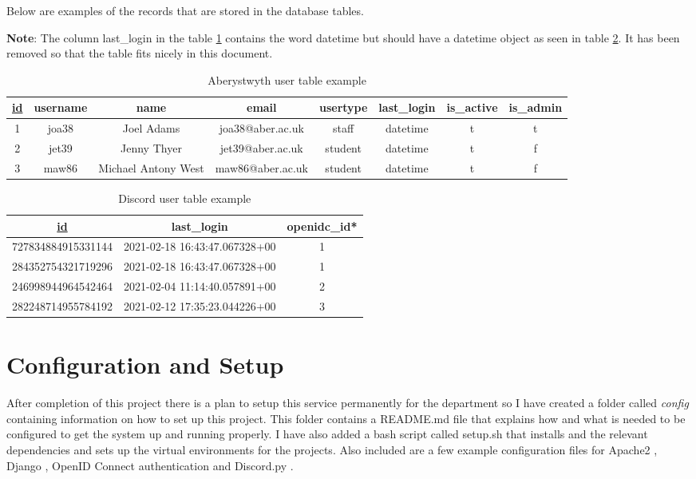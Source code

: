 Below are examples of the records that are stored in the database tables. 

\textbf{Note}: The column last\_login in the table \ref{tab:aber-table} contains the word datetime but should have a datetime object as seen in table \ref{tab:dis-table}. It has been removed so that the table fits nicely in this document.

\begin{table}[H]
	\centering
	\small
	\setlength\tabcolsep{2pt}
	\begin{tabular}{|c|c|c|c|c|c|c|c|}
		\hline
		\underline{id} & username & name & email & usertype & last\_login & is\_active & is\_admin \\
		\hline
		1 & joa38 & Joel Adams & joa38@aber.ac.uk & staff & datetime & t & t \\
		2 & jet39 & Jenny Thyer & jet39@aber.ac.uk & student & datetime & t & f \\
		3 & maw86 & Michael Antony West & maw86@aber.ac.uk & student & datetime & t & f \\
		\hline 
	\end{tabular}
	\caption{Aberystwyth user table example}
	\label{tab:aber-table}
\end{table}

\begin{table}[H]
	\centering
	\small
	\setlength\tabcolsep{2pt}
	\begin{tabular}{|c|c|c|}
		\hline
		\underline{id}                 & last\_login                   & openidc\_id* \\
		\hline
		727834884915331144 & 2021-02-18 16:43:47.067328+00 & 1           \\
		284352754321719296 & 2021-02-18 16:43:47.067328+00 & 1           \\
		246998944964542464 & 2021-02-04 11:14:40.057891+00 & 2           \\
		282248714955784192 & 2021-02-12 17:35:23.044226+00 & 3           \\
		\hline
	\end{tabular}
	\caption{Discord user table example}
	\label{tab:dis-table}
\end{table}

\section{Configuration and Setup}
After completion of this project there is a plan to setup this service permanently for the department so I have created a folder called \textit{config} containing information on how to set up this project. This folder contains a README.md file that explains how and what is needed to be configured to get the system up and running properly. I have also added a bash script called setup.sh that installs and the relevant dependencies and sets up the virtual environments for the projects. Also included are a few example configuration files for Apache2 \cite{apache2}, Django \cite{Django}, OpenID Connect authentication \cite{OpenID} and Discord.py \cite{discord.py}.

